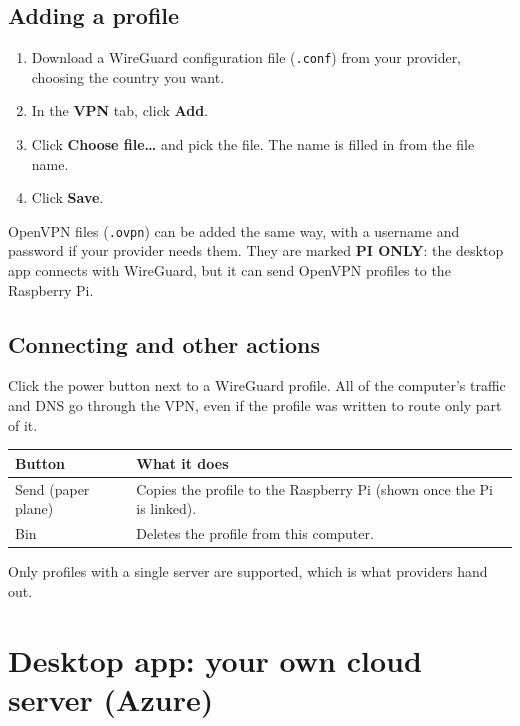 \documentclass[11pt,a4paper]{article}
\newcommand{\ui}[1]{\textbf{#1}}            %
\newcommand{\file}[1]{\texttt{#1}}          %
\begin{document}
\subsection{Adding a profile}

\begin{enumerate}
  \item Download a WireGuard configuration file (\file{.conf}) from your provider, choosing the country you want.
  \item In the \ui{VPN} tab, click \ui{Add}.
  \item Click \ui{Choose file\ldots} and pick the file. The name is filled in from the file name.
  \item Click \ui{Save}.
\end{enumerate}

OpenVPN files (\file{.ovpn}) can be added the same way, with a username and password if your provider needs them. They are marked \ui{PI ONLY}: the desktop app connects with WireGuard, but it can send OpenVPN profiles to the Raspberry Pi.

\subsection{Connecting and other actions}

Click the power button next to a WireGuard profile. All of the computer's traffic and DNS go through the VPN, even if the profile was written to route only part of it.

\begin{center}
\begin{tabularx}{\linewidth}{@{}l L@{}}
\toprule
\textbf{Button} & \textbf{What it does} \\
\midrule
Send (paper plane) & Copies the profile to the Raspberry Pi (shown once the Pi is linked). \\
Bin & Deletes the profile from this computer. \\
\bottomrule
\end{tabularx}
\end{center}

Only profiles with a single server are supported, which is what providers hand out.

\section{Desktop app: your own cloud server (Azure)}
\end{document}
